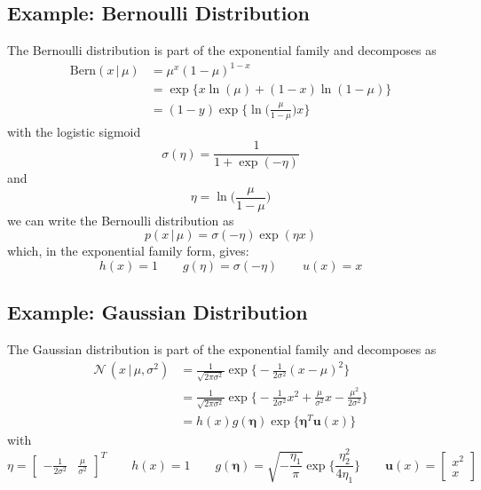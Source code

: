 \documentclass[a4paper, 11pt, accentcolor = tud3b]{tudreport}
\newcommand{\given}{\ensuremath{\,\vert\,}}
\renewcommand{\vec}[1]{\mathbf{#1}}
\begin{document}
			\subsection{Example: Bernoulli Distribution}
				The Bernoulli distribution is part of the exponential family and decomposes as
				\begin{align}
					\textrm{Bern}(x \given \mu) &= \mu^x (1 - \mu)^{1 - x} \\
						&= \exp \big\{ x \ln(\mu) + (1 - x) \ln(1 - \mu) \big\} \\
						&= (1 - y) \exp \Bigg\{ \ln\bigg(\!\frac{\mu}{1 - \mu} \bigg) x \Bigg\}
				\end{align}
				with the logistic sigmoid
				\begin{equation}
					\sigma(\eta) = \frac{1}{1 + \exp(-\eta)}
				\end{equation}
				and
				\begin{equation}
					\eta = \ln\bigg(\!\frac{\mu}{1 - \mu} \bigg)
				\end{equation}
				we can write the Bernoulli distribution as
				\begin{equation}
					p(x \given \mu) = \sigma(-\eta) \exp(\eta x)
				\end{equation}
				which, in the exponential family form, gives:
				\begin{equation}
					h(x) = 1 \qquad g(\eta) = \sigma(-\eta) \qquad u(x) = x
				\end{equation}

			\subsection{Example: Gaussian Distribution}
				The Gaussian distribution is part of the exponential family and decomposes as
				\begin{align}
					\mathcal{N}\,(x \given \mu, \sigma^2) &= \frac{1}{\sqrt{2\pi\sigma^2}} \exp\Bigg\{ -\frac{1}{2\sigma^2} (x - \mu)^2 \Bigg\} \\
						&= \frac{1}{\sqrt{2\pi\sigma^2}} \exp\Bigg\{ -\frac{1}{2\sigma^2} x^2 + \frac{\mu}{\sigma^2} x - \frac{\mu^2}{2\sigma^2} \Bigg\} \\
						&= h(x) g(\vec{\eta}) \exp\big\{ \vec{\eta}^T \vec{u}(x) \big\}
				\end{align}
				with
				\begin{equation}
					\eta = \begin{bmatrix} -\frac{1}{2\sigma^2} & \frac{\mu}{\sigma^2} \end{bmatrix}^T \qquad h(x) = 1 \qquad g(\vec{\eta}) = \sqrt{-\frac{\eta_1}{\pi}} \exp \Bigg\{ \frac{\eta_2^2}{4\eta_1} \Bigg\} \qquad \vec{u}(x) = \begin{bmatrix} x^2 \\ x \end{bmatrix}
				\end{equation}
\end{document}
